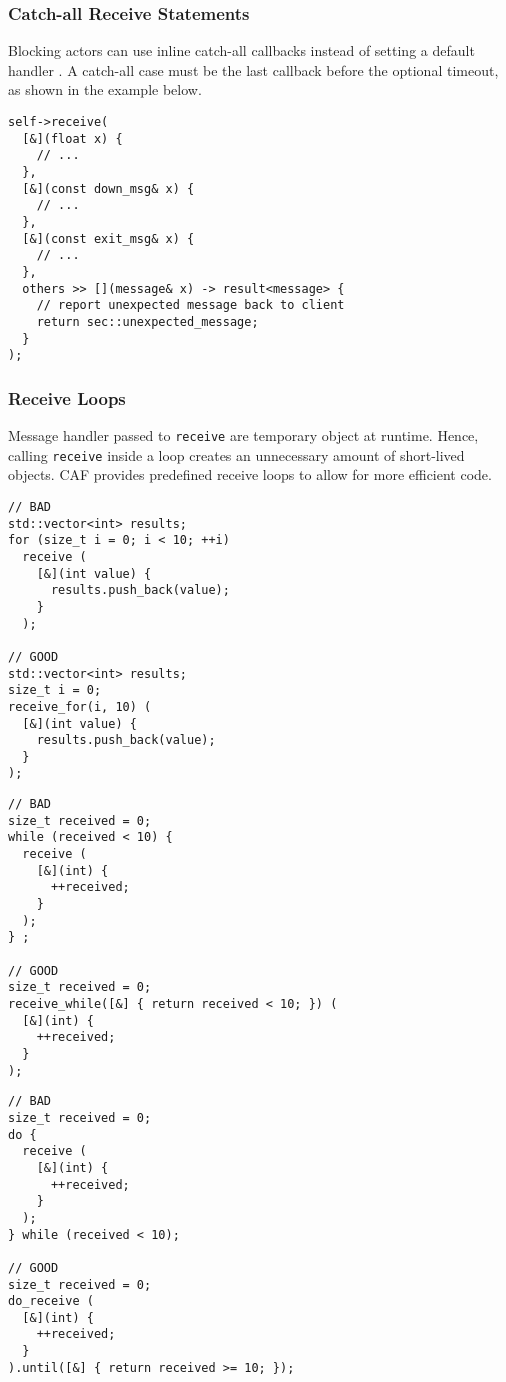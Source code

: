 \subsubsection{Catch-all Receive Statements}
\label{catch-all}

Blocking actors can use inline catch-all callbacks instead of setting a default
handler . A catch-all case must be the last callback
before the optional timeout, as shown in the example below.

\begin{lstlisting}
self->receive(
  [&](float x) {
    // ...
  },
  [&](const down_msg& x) {
    // ...
  },
  [&](const exit_msg& x) {
    // ...
  },
  others >> [](message& x) -> result<message> {
    // report unexpected message back to client
    return sec::unexpected_message;
  }
);
\end{lstlisting}

\clearpage
\subsubsection{Receive Loops}
\label{receive-loop}

Message handler passed to \lstinline^receive^ are temporary object at runtime.
Hence, calling \lstinline^receive^ inside a loop creates an unnecessary amount
of short-lived objects. CAF provides predefined receive loops to allow for
more efficient code.

\begin{lstlisting}
// BAD
std::vector<int> results;
for (size_t i = 0; i < 10; ++i)
  receive (
    [&](int value) {
      results.push_back(value);
    }
  );

// GOOD
std::vector<int> results;
size_t i = 0;
receive_for(i, 10) (
  [&](int value) {
    results.push_back(value);
  }
);
\end{lstlisting}

\begin{lstlisting}
// BAD
size_t received = 0;
while (received < 10) {
  receive (
    [&](int) {
      ++received;
    }
  );
} ;

// GOOD
size_t received = 0;
receive_while([&] { return received < 10; }) (
  [&](int) {
    ++received;
  }
);
\end{lstlisting}
\clearpage

\begin{lstlisting}
// BAD
size_t received = 0;
do {
  receive (
    [&](int) {
      ++received;
    }
  );
} while (received < 10);

// GOOD
size_t received = 0;
do_receive (
  [&](int) {
    ++received;
  }
).until([&] { return received >= 10; });
\end{lstlisting}

